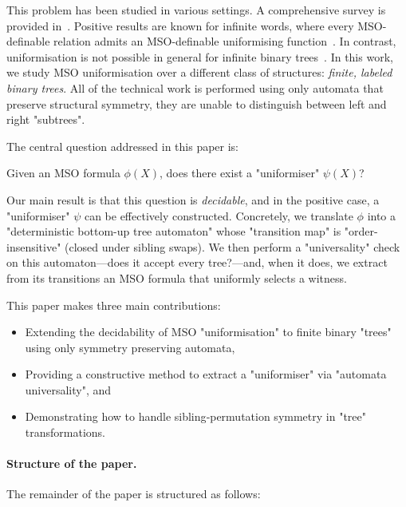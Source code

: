 \documentclass[a4paper,UKenglish,cleveref, autoref, thm-restate]{lipics-v2021}
\begin{document}
This problem has been studied in various settings. A comprehensive survey is provided in~\cite{Cara15}. Positive results are known for infinite words, where every MSO-definable
relation admits an MSO-definable uniformising function~\cite{Siefkes1975, Choffrut1999, Rabin07}. In contrast, uniformisation is not possible in general for infinite binary
trees~\cite{GS83}.
In this work, we study MSO uniformisation over a different class of structures: \emph{finite, labeled binary trees}.
All of the technical work is performed using only automata that preserve structural symmetry,
\ie they are unable to distinguish between left and right "subtrees".

The central question addressed in this paper is:

\begin{problem}\label{prob:uniformisation-problem}
\AP Given an MSO formula $\phi(X)$, does there exist a "uniformiser" $\psi(X)$?
\end{problem}

Our main result is that this question is \emph{decidable}, and in the positive case, a "uniformiser" $\psi$ can be effectively constructed. Concretely, we translate $\phi$ into a
"deterministic bottom-up tree automaton" whose "transition map" is "order-insensitive" (\ie closed under sibling swaps). We then perform a "universality" check on this
automaton—does it accept every tree?—and, when it does, we extract from its transitions an MSO formula that uniformly selects a witness.

This paper makes three main contributions:
\begin{itemize}
	\item Extending the decidability of MSO "uniformisation" to finite binary "trees" using only symmetry preserving automata,
	\item Providing a constructive method to extract a "uniformiser" via "automata universality", and
	\item Demonstrating how to handle sibling‐permutation symmetry in "tree" transformations.
\end{itemize}


\paragraph*{Structure of the paper.} The remainder of the paper is structured as follows:
\end{document}
